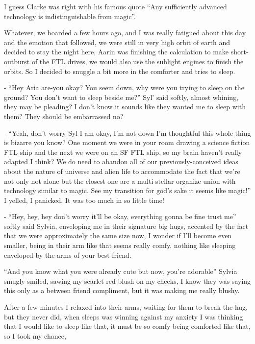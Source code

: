 \documentclass[hidelinks,12pt,a4paper]{book}
\begin{document}
I guess Clarke was right with his famous quote “Any sufficiently advanced technology is indistinguishable from magic”.\par
\bigskip

Whatever, we boarded a few hours ago, and I was really fatigued about this day and the emotion that followed, 
we were still in very high orbit of earth and decided to stay the night here, Aarin was finishing the 
calculation to make short-outburst of the FTL drives, we would also use the sublight engines to finish the orbits. 
So I decided to snuggle a bit more in the comforter and tries to sleep.\par
\bigskip

- “Hey Aria are-you okay? You seem down, why were you trying to sleep on the ground? You don't want to 
sleep beside me?” Syl' said softly, almost whining, they may be pleading? I don't know it sounds like 
they wanted me to sleep with them? They should be embarrassed no?\par
\bigskip

- “Yeah, don't worry Syl I am okay, I'm not down I'm thoughtful this whole thing is bizarre you know?
 One moment we were in your room drawing a science fiction FTL ship and the next we were on an SF FTL ship, so my 
 brain haven't really adapted I think? We do need to abandon all of our previously-conceived ideas about the 
 nature of universe and alien life to accommodate the fact that we're not only not alone but the closest one are 
 a multi-stellar organize union with technology similar to magic. See my transition for god's sake it seems 
 like magic!” I yelled, I panicked, It was too much in so little time!\par
 \bigskip

- “Hey, hey, hey don't worry it'll be okay, everything gonna be fine trust me” softly said Sylvia, enveloping 
me in their signature big hugs, accented by the fact that we were approximately the same size now, I wonder if 
I'll become even smaller, being in their arm like that seems really comfy, nothing like sleeping enveloped by the arms 
of your best friend.\par
\bigskip

“And you know what you were already cute but now, you're adorable” Sylvia smugly smiled, sawing my 
scarlet-red blush on my cheeks, I know they was saying this only as a between friend compliment, but it was 
making me really blushy.\par
\bigskip

After a few minutes I relaxed into their arms, waiting for them to break the hug, but they never did, 
when sleeps was winning against my anxiety I was thinking that I would like to sleep like that,
 it must be so comfy being comforted like that, so I took my chance,\par
 \bigskip
\end{document}
